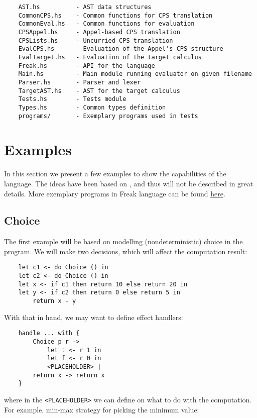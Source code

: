 \documentclass{article}
\theoremstyle{definition}
\theoremstyle{lemma}
\theoremstyle{observation}
\theoremstyle{theorem}
\begin{document}
    \begin{verbatim}
    AST.hs          - AST data structures
    CommonCPS.hs    - Common functions for CPS translation
    CommonEval.hs   - Common functions for evaluation
    CPSAppel.hs     - Appel-based CPS translation
    CPSLists.hs     - Uncurried CPS translation
    EvalCPS.hs      - Evaluation of the Appel's CPS structure
    EvalTarget.hs   - Evaluation of the target calculus
    Freak.hs        - API for the language
    Main.hs         - Main module running evaluator on given filename
    Parser.hs       - Parser and lexer
    TargetAST.hs    - AST for the target calculus
    Tests.hs        - Tests module
    Types.hs        - Common types definition
    programs/       - Exemplary programs used in tests
    \end{verbatim}

\section{Examples}
\label{sec:examples}

    In this section we present a few examples to show the capabilities of the
    language. The ideas have been based on \cite{programming-in-eff}, and thus will not be
    described in great details. More exemplary programs in Freak language can
    be found \href{https://github.com/Tomatosoup97/freak/tree/master/src/programs}{\underline{here}}.

    \subsection{Choice}
    \label{sec:choice-example}

    The first example will be based on modelling (nondeterministic) choice
    in the program. We will make two decisions, which will affect the computation
    result:

    \begin{verbatim}
    let c1 <- do Choice () in
    let c2 <- do Choice () in
    let x <- if c1 then return 10 else return 20 in
    let y <- if c2 then return 0 else return 5 in
        return x - y
    \end{verbatim}
    With that in hand, we may want to define effect handlers:

    \begin{verbatim}
    handle ... with {
        Choice p r ->
            let t <- r 1 in
            let f <- r 0 in
            <PLACEHOLDER> |
        return x -> return x
    }
    \end{verbatim}
    where in the \verb!<PLACEHOLDER>! we can define on what to do with the
    computation. For example, min-max strategy for picking the minimum value:
\end{document}
